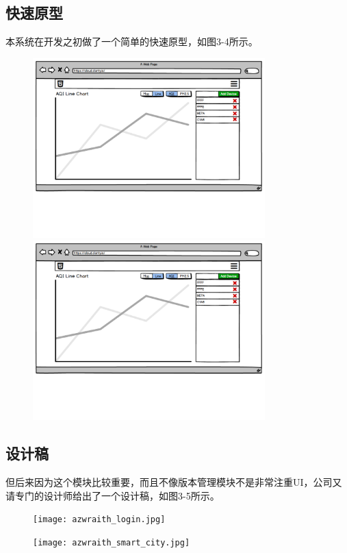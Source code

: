 \subsection{快速原型}
本系统在开发之初做了一个简单的快速原型，如图3-4所示。
\begin{figure}[!htp]
 \centering
 \includegraphics[width=0.8\textwidth]{pdf/azwraith_prototype.pdf}
 \includegraphics[width=0.8\textwidth]{pdf/azwraith_prototype.pdf}
\end{figure}

\subsection{设计稿}
但后来因为这个模块比较重要，而且不像版本管理模块不是非常注重UI，公司又请专门的设计师给出了一个设计稿，如图3-5所示。
\begin{figure}[htb]
 \centering
 \texttt{[image: azwraith\_login.jpg]}
 
 \vspace{0.5cm}
 
 \texttt{[image: azwraith\_smart\_city.jpg]}
\end{figure}

